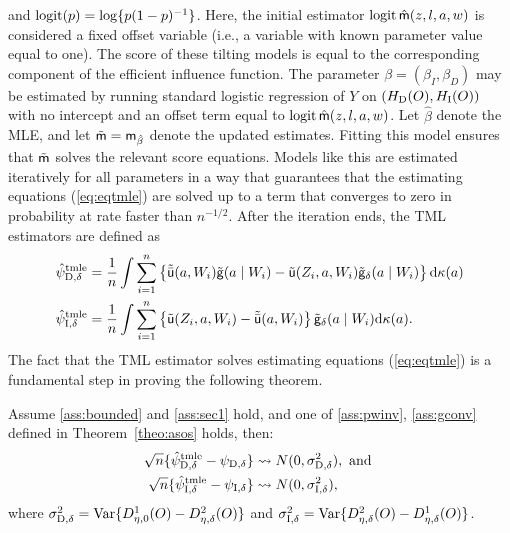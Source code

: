 and $\operatorname{logit}(p) = \log\{p(1-p)^{-1}\}$. Here, the initial estimator $\operatorname{logit}
\hat{\mathsf{m}}(z,l,a,w)$ is considered a fixed offset variable (i.e., a variable with
known parameter value equal to one). The score of these tilting models is equal
to the corresponding component of the efficient influence function. The
parameter $\beta=(\beta_I, \beta_D)$ may be estimated by running standard
logistic regression of $Y$ on $(H_{\mbox{\scriptsize D}}(O),
H_{\mbox{\scriptsize I}}(O))$ with no intercept and an offset term equal to
$\operatorname{logit} \hat{\mathsf{m}}(z,l,a,w)$. Let $\hat\beta$ denote the MLE, and let $\tilde
{\mathsf{m}}=\mathsf{m}_{\hat\beta}$ denote the updated estimates. Fitting this model ensures that
$\tilde{\mathsf{m}}$ solves the relevant score equations. Models like this are estimated
iteratively for all parameters in a way that guarantees that the estimating
equations (\ref{eq:eqtmle}) are solved up to a term that converges to zero in
probability at rate faster than $n^{-1/2}$. After the iteration ends, the TML
estimators are defined as
\begin{equation}
  \begin{split}
    \hat\psi_{\mbox{\scriptsize D}, \delta}^{\mbox{\scriptsize tmle}} &= \frac{1}{n} \int\sum_{i = 1}^n
    \left\{\tilde{\bar{\mathsf{u}}}(a,W_i)\tilde{\mathsf{g}}(a\mid W_i) -
      \tilde{\mathsf{u}}(Z_i,a,W_i)\tilde{\mathsf{g}}_\delta(a\mid W_i)\right\}\mathrm{d}\kappa(a)\\
    \hat\psi_{\mbox{\scriptsize I}, \delta}^{\mbox{\scriptsize tmle}} &= \frac{1}{n} \int\sum_{i = 1}^n
    \left\{\tilde{\mathsf{u}}(Z_i,a,W_i) -
      \tilde{\bar{\mathsf{u}}}(a,W_i)\right\}\tilde{\mathsf{g}}_\delta(a\mid
    W_i)\mathrm{d}\kappa(a).
  \end{split}\label{eq:tmle}
\end{equation}
The fact that the TML estimator solves estimating equations (\ref{eq:eqtmle}) is
a fundamental step in proving the following theorem.
\begin{theorem}
  \label{theo:astmle}\label{finalthm}
  Assume \ref{ass:bounded} and \ref{ass:sec1} hold, and one of
  \ref{ass:pwinv}, \ref{ass:gconv} defined in Theorem~\ref{theo:asos}
  holds, then:
  \begin{align*}
    \sqrt{n}\{\hat\psi_{\mbox{\scriptsize D}, \delta}^{\mbox{\scriptsize tmle}} - \psi_{\mbox{\scriptsize D}, \delta}\} &\rightsquigarrow N(0,
                                  \sigma^2_{\mbox{\scriptsize D},\delta}),
                                  \text{ and }\\
    \sqrt{n}\{\hat\psi_{\mbox{\scriptsize I}, \delta}^{\mbox{\scriptsize tmle}} - \psi_{\mbox{\scriptsize I}, \delta}\} &\rightsquigarrow N(0,
                                  \sigma^2_{\mbox{\scriptsize I},\delta}),
  \end{align*}
  where
  $\sigma^2_{\mbox{\scriptsize D},\delta} = \operatorname{Var}\{D_{\eta, 0}^1(O)
  -D_{\eta, \delta}^2(O)\}$ and $\sigma^2_{\mbox{\scriptsize I},\delta} =
    \operatorname{Var}\{D_{\eta, \delta}^2(O) - D_{\eta, \delta}^1(O)\}$.
\end{theorem}
